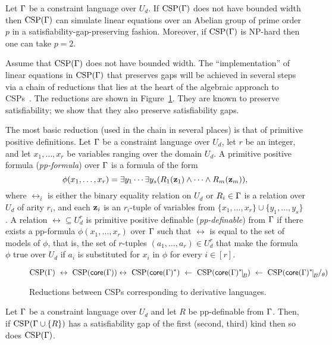 \documentclass[11pt,letter]{article}
\begin{document}
\begin{theorem}\label{the:hsp-gap-o}
Let $\Gamma$ be a constraint language over $U_d$. 
If ${\rm CSP}(\Gamma)$ does not have bounded width then ${\rm CSP}(\Gamma)$ can simulate linear
  equations over an Abelian group of prime order $p$ in a
  satisfiability-gap-preserving fashion. Moreover, if ${\rm CSP}(\Gamma)$ is NP-hard
  then one can take $p=2$.
\end{theorem}


Assume that ${\rm CSP}(\Gamma)$ does not have bounded width. The ``implementation'' of
linear equations in ${\rm CSP}(\Gamma)$ that preserves gaps will be achieved
in several steps via a 
chain of reductions that lies at the heart of the algebraic approach to CSPs~\cite{Bulatov05:classifying}. 
The reductions are shown in Figure~\ref{fig:reductions-o}. They are
known to preserve satisfiability; we show that they also preserve satisfiability
gaps. 

The most basic reduction (used in the chain in several places) is that of
primitive positive definitions. 
Let $\Gamma$ be a constraint language over $U_d$, let $r$ be an integer, and
let $x_1,\ldots,x_r$ be variables ranging over the domain $U_d$. A primitive
positive formula (\emph{pp-formula}) over $\Gamma$ is a formula of the form
\begin{equation}\label{eq:pp-formula-o}
  \phi(x_1,\ldots,x_r)=\exists y_1\cdots\exists y_s(R_1({\bf z}_1)\wedge\cdots\wedge
  R_m({\bf z}_m)),
\end{equation}
where $\rel_i$ is either the binary equality relation on $U_d$ or $R_i\in\Gamma$ is a relation over $U_d$ of arity $r_i$, and each ${\bf z}_i$ is an $r_i$-tuple of variables from
$\{x_1,\ldots,x_r\}\cup\{y_1,\ldots,y_s\}$.
A relation $\rel\subseteq U_d^r$ is primitive positive definable
(\emph{pp-definable}) from $\Gamma$ if there
exists a pp-formula $\phi(x_1,\ldots,x_r)$ over $\Gamma$ such that $\rel$ is equal to the set of
models of $\phi$, that is, the set of $r$-tuples $(a_1,\ldots,a_r)\in U_d^r$
that make the formula $\phi$ true over $U_d$ if $a_i$ is
substituted for $x_i$ in $\phi$ for every $i\in [r]$.

\begin{figure}[t!]
\[
\CSP(\Gm)\ \leftrightarrow\ \CSP(\core(\Gm)) \leftrightarrow\ \CSP(\core(\Gm)^*)\ \leftarrow\ \CSP(\core(\Gm)^*\red B) \ \leftarrow\ \CSP(\core(\Gm)^*\red B\fac\th)
\]
\caption{Reductions between CSPs corresponding to derivative languages.}
\label{fig:reductions-o}
\end{figure}


\begin{theorem}\label{the:pp-o}
  Let $\Gamma$ be a constraint language over $U_d$ and let $R$ be pp-definable from
  $\Gamma$. Then, if ${\rm CSP}(\Gamma\cup\{R\})$ has a satisfiability gap of the first (second, third) kind then so does
  ${\rm CSP}(\Gamma)$.
\end{theorem}
\end{document}
